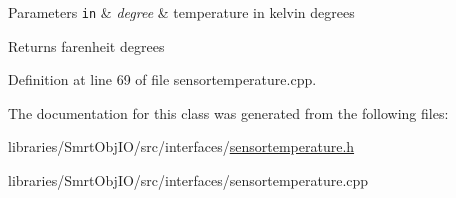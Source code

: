 \begin{DoxyParams}[1]{Parameters}
\mbox{\tt in}  & {\em degree} & temperature in kelvin degrees\\
\hline
\end{DoxyParams}
\begin{DoxyReturn}{Returns}
farenheit degrees 
\end{DoxyReturn}


Definition at line 69 of file sensortemperature.\+cpp.



The documentation for this class was generated from the following files\+:\begin{DoxyCompactItemize}
\item 
libraries/\+Smrt\+Obj\+I\+O/src/interfaces/\hyperlink{sensortemperature_8h}{sensortemperature.\+h}\item 
libraries/\+Smrt\+Obj\+I\+O/src/interfaces/sensortemperature.\+cpp\end{DoxyCompactItemize}
